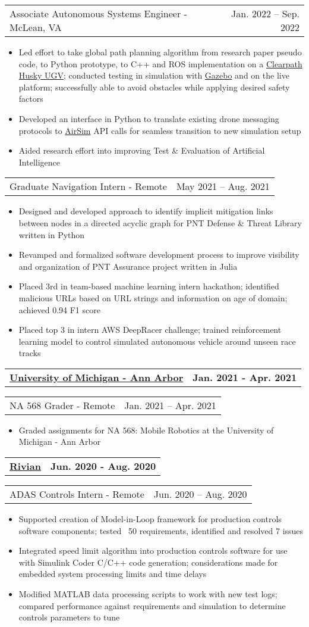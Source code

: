 \documentclass[letterpaper,11pt]{article}
\makeatletter
\newcommand{\resumeItem}[1]{
	\item\small{
		#1
	}
}
\newcommand{\resumeCompanyHeading}[2]{
  \vspace{-1pt}\item
    \begin{tabular*}{0.97\textwidth}[t]{l@{\extracolsep{\fill}}r}
      \textbf{#1} & \textbf{#2} \\
    \end{tabular*}\vspace{-0pt}
}
\newcommand{\resumeJobHeading}[3]{
	\vspace{-1pt}
	\begin{tabular*}{0.97\textwidth}[t]{l@{\extracolsep{\fill}}r}
		{\small#1} - {\small #2} & {\small #3} \\
	\end{tabular*}\vspace{-4pt}
}
\newcommand{\resumeItemListStart}{\begin{itemize}}
\newcommand{\resumeItemListEnd}{\end{itemize}\vspace{-4pt}}
\makeatother
\begin{document}
    \resumeJobHeading{Associate Autonomous Systems Engineer}{McLean, VA}{Jan. 2022 -- Sep. 2022}
    \resumeItemListStart
      \resumeItem{Led effort to take global path planning algorithm from research paper pseudo code, to Python prototype, to C++ and ROS implementation on a \href{https://clearpathrobotics.com/husky-unmanned-ground-vehicle-robot/}{Clearpath Husky UGV}; conducted testing in simulation with \href{https://gazebosim.org/home}{Gazebo} and on the live platform; successfully able to avoid obstacles while applying desired safety factors}
      \resumeItem{Developed an interface in Python to translate existing drone messaging protocols to \href{https://microsoft.github.io/AirSim/}{AirSim} API calls for seamless transition to new simulation setup}
      \resumeItem{Aided research effort into improving Test \& Evaluation of Artificial Intelligence}
    \resumeItemListEnd

    \resumeJobHeading{Graduate Navigation Intern}{Remote}{May 2021 -- Aug. 2021}
    \resumeItemListStart
      \resumeItem{Designed and developed approach to identify implicit mitigation links between nodes in a directed acyclic graph for PNT Defense \& Threat Library written in Python}
      \resumeItem{Revamped and formalized software development process to improve visibility and organization of PNT Assurance project written in Julia}
      \resumeItem{Placed 3rd in team-based machine learning intern hackathon; identified malicious URLs based on URL strings and information on age of domain; achieved 0.94 F1 score}
      \resumeItem{Placed top 3 in intern AWS DeepRacer challenge; trained reinforcement learning model to control simulated autonomous vehicle around unseen race tracks}
    \resumeItemListEnd

  \resumeCompanyHeading{\href{https://umich.edu/}{University of Michigan - Ann Arbor}}{Jan. 2021 - Apr. 2021}
    \resumeJobHeading{NA 568 Grader}{Remote}{Jan. 2021 -- Apr. 2021}
    \resumeItemListStart
      \resumeItem{Graded assignments for NA 568: Mobile Robotics at the University of Michigan - Ann Arbor}
    \resumeItemListEnd

  \resumeCompanyHeading{\href{https://rivian.com/}{Rivian}}{Jun. 2020 - Aug. 2020}
    \resumeJobHeading{ADAS Controls Intern}{Remote}{Jun. 2020 -- Aug. 2020}
    \resumeItemListStart
      \resumeItem{Supported creation of Model-in-Loop framework for production controls software components; tested ~50 requirements, identified and resolved 7 issues}
      \resumeItem{Integrated speed limit algorithm into production controls software for use with Simulink Coder C/C++ code generation; considerations made for embedded system processing limits and time delays}
      \resumeItem{Modified MATLAB data processing scripts to work with new test logs; compared performance against requirements and simulation to determine controls parameters to tune}
    \resumeItemListEnd
\end{document}
